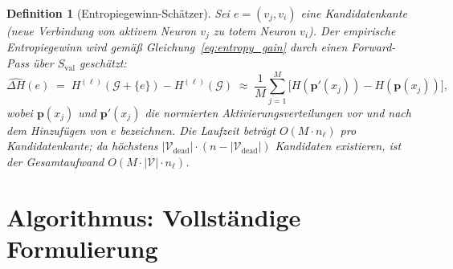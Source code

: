 ﻿\documentclass[12pt, a4paper, openany]{report}
\newtheorem{definition}[theorem]{Definition}
\newcommand{\calG}{\mathcal{G}}
\newcommand{\calV}{\mathcal{V}}
\begin{document}
\begin{definition}[Entropiegewinn-Schätzer]
\label{def:entropy_estimator}
Sei $e = (v_j, v_i)$ eine Kandidatenkante (neue Verbindung von aktivem
Neuron $v_j$ zu totem Neuron $v_i$).  Der \emph{empirische Entropiegewinn}
wird gemäß Gleichung~\eqref{eq:entropy_gain} durch einen Forward-Pass
über $S_{\mathrm{val}}$ geschätzt:
\begin{equation}
  \label{eq:entropy_estimator}
  \widehat{\Delta H}(e)
  \;=\;
  H^{(\ell)}(\calG + \{e\}) - H^{(\ell)}(\calG)
  \;\approx\;
  \frac{1}{M}\sum_{j=1}^{M}
  \bigl[H(\bm{p}'(x_j)) - H(\bm{p}(x_j))\bigr],
\end{equation}
wobei $\bm{p}(x_j)$ und $\bm{p}'(x_j)$ die normierten Aktivierungsverteilungen
vor und nach dem Hinzufügen von $e$ bezeichnen.  Die Laufzeit beträgt
$O(M \cdot n_\ell)$ pro Kandidatenkante; da höchstens $|\calV_{\mathrm{dead}}| \cdot
(n - |\calV_{\mathrm{dead}}|)$ Kandidaten existieren, ist der Gesamtaufwand
$O(M \cdot |\calV| \cdot n_\ell)$.
\end{definition}

\section{Algorithmus: Vollständige Formulierung}
\label{sec:algo_full}
\end{document}
